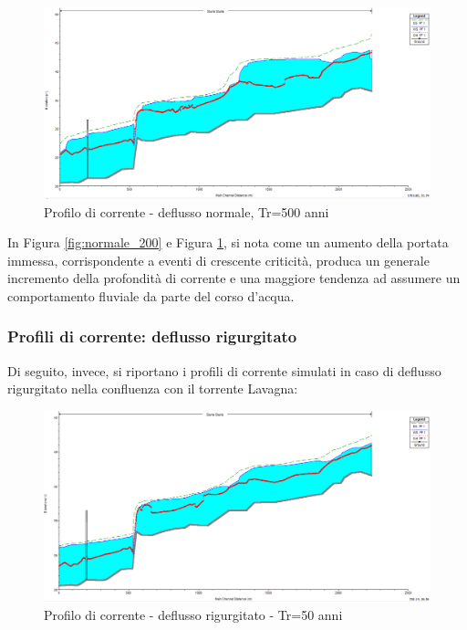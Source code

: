 \documentclass[12pt]{article} %
\begin{document}
\begin{figure}[H]
    \centering
    \includegraphics[scale=0.5]{ProfU1223.PNG}
    \caption{Profilo di corrente - deflusso normale, Tr=500 anni}
    \label{fig:normale_500}
\end{figure}

\noindent In Figura \ref{fig:normale_200} e Figura \ref{fig:normale_500}, si nota come un aumento della portata immessa, corrispondente a eventi di crescente criticità, produca un generale incremento della profondità di corrente e una maggiore tendenza ad assumere un comportamento fluviale da parte del corso d'acqua.

\newpage
\subsubsection{Profili di corrente: deflusso rigurgitato}
\noindent Di seguito, invece, si riportano i profili di corrente simulati in caso di deflusso rigurgitato nella confluenza con il torrente Lavagna:

\begin{figure}[H]
    \centering
    \includegraphics[scale=0.5]{Prof56.PNG}
    \caption{Profilo di corrente - deflusso rigurgitato - Tr=50 anni}
\end{figure}
\end{document}
